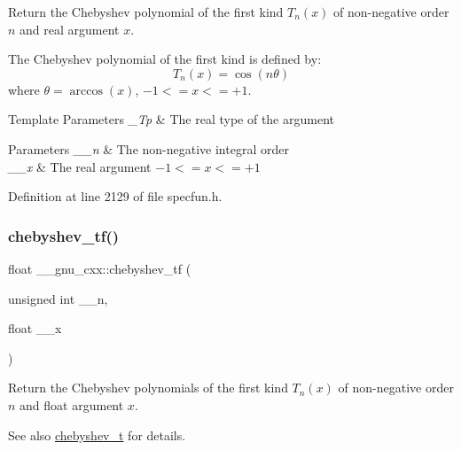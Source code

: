 Return the Chebyshev polynomial of the first kind $ T_n(x) $ of non-\/negative order $ n $ and real argument $ x $.

The Chebyshev polynomial of the first kind is defined by\+: \[ T_n(x) = \cos(n \theta) \] where $ \theta = \arccos(x) $, $ -1 <= x <= +1 $.


\begin{DoxyTemplParams}{Template Parameters}
{\em \+\_\+\+Tp} & The real type of the argument \\
\hline
\end{DoxyTemplParams}

\begin{DoxyParams}{Parameters}
{\em \+\_\+\+\_\+n} & The non-\/negative integral order \\
\hline
{\em \+\_\+\+\_\+x} & The real argument $ -1 <= x <= +1 $ \\
\hline
\end{DoxyParams}


Definition at line 2129 of file specfun.\+h.

\mbox{\label{group__gnu__math__spec__func_gab8cdb55702d9c8b85af4ecc3d8c6a134}} 
\subsubsection{\texorpdfstring{chebyshev\+\_\+tf()}{chebyshev\_tf()}}
{\footnotesize\ttfamily float \+\_\+\+\_\+gnu\+\_\+cxx\+::chebyshev\+\_\+tf (\begin{DoxyParamCaption}\item[{unsigned int}]{\+\_\+\+\_\+n,  }\item[{float}]{\+\_\+\+\_\+x }\end{DoxyParamCaption})\hspace{0.3cm}{\ttfamily [inline]}}

Return the Chebyshev polynomials of the first kind $ T_n(x) $ of non-\/negative order $ n $ and {\ttfamily float} argument $ x $.

\begin{DoxySeeAlso}{See also}
\hyperlink{group__gnu__math__spec__func_ga4d9cae9de13a64ceeb4fb0226f4b7844}{chebyshev\+\_\+t} for details. 
\end{DoxySeeAlso}


